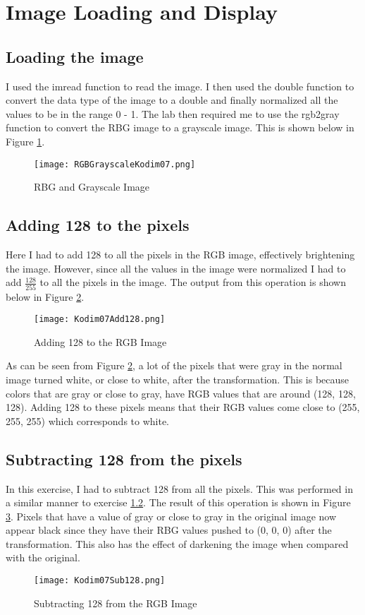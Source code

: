 \section{Image Loading and Display}
\subsection{Loading the image}
I used the imread function to read the image. I then used the double function to convert the data type of the image to a double and finally normalized all the values to be in the range 0 - 1. The lab then required me to use the rgb2gray function to convert the RBG image to a grayscale image. This is shown below in Figure \ref{fig:RBGGrayTransform}.

\begin{figure}[h]
    \texttt{[image: RGBGrayscaleKodim07.png]}
    \centering
    \caption{RBG and Grayscale Image}
    \label{fig:RBGGrayTransform}
\end{figure}

\subsection{Adding 128 to the pixels}
\label{sec:SubSecAdd128}
Here I had to add 128 to all the pixels in the RGB image, effectively brightening the image. However, since all the values in the image were normalized I had to add $\frac{128}{255}$ to all the pixels in the image. The output from this operation is shown below in Figure \ref{fig:128AddTransform}.

\begin{figure}[h]
    \texttt{[image: Kodim07Add128.png]}
    \centering
    \caption{Adding 128 to the RGB Image}
    \label{fig:128AddTransform}
\end{figure}

As can be seen from Figure \ref{fig:128AddTransform}, a lot of the pixels that were gray in the normal image turned white, or close to white, after the transformation. This is because colors that are gray or close to gray, have RGB values that are around (128, 128, 128). Adding 128 to these pixels means that their RGB values come close to (255, 255, 255) which corresponds to white.

\subsection{Subtracting 128 from the pixels}
In this exercise, I had to subtract 128 from all the pixels. This was performed in a similar manner to exercise \ref{sec:SubSecAdd128}. The result of this operation is shown in Figure \ref{fig:128SubTransform}. Pixels that have a value of gray or close to gray in the original image now appear black since they have their RBG values pushed to (0, 0, 0) after the transformation. This also has the effect of darkening the image when compared with the original.
\pagebreak
\begin{figure}[h]
    \texttt{[image: Kodim07Sub128.png]}
    \centering
    \caption{Subtracting 128 from the RGB Image}
    \label{fig:128SubTransform}
\end{figure}

